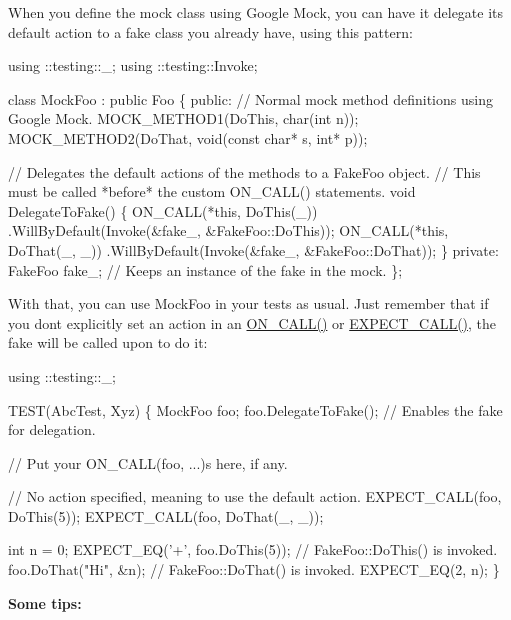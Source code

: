When you define the mock class using Google Mock, you can have it delegate its default action to a fake class you already have, using this pattern\+:


\begin{DoxyCode}
using ::testing::\_;
using ::testing::Invoke;

class MockFoo : public Foo \{
 public:
  // Normal mock method definitions using Google Mock.
  MOCK\_METHOD1(DoThis, char(int n));
  MOCK\_METHOD2(DoThat, void(const char* s, int* p));

  // Delegates the default actions of the methods to a FakeFoo object.
  // This must be called *before* the custom ON\_CALL() statements.
  void DelegateToFake() \{
    ON\_CALL(*this, DoThis(\_))
        .WillByDefault(Invoke(&fake\_, &FakeFoo::DoThis));
    ON\_CALL(*this, DoThat(\_, \_))
        .WillByDefault(Invoke(&fake\_, &FakeFoo::DoThat));
  \}
 private:
  FakeFoo fake\_;  // Keeps an instance of the fake in the mock.
\};
\end{DoxyCode}


With that, you can use {\ttfamily Mock\+Foo} in your tests as usual. Just remember that if you don\textquotesingle{}t explicitly set an action in an {\ttfamily \hyperlink{gmock-spec-builders_8h_a5b12ae6cf84f0a544ca811b380c37334}{O\+N\+\_\+\+C\+A\+L\+L()}} or {\ttfamily \hyperlink{gmock-spec-builders_8h_a535a6156de72c1a2e25a127e38ee5232}{E\+X\+P\+E\+C\+T\+\_\+\+C\+A\+L\+L()}}, the fake will be called upon to do it\+:


\begin{DoxyCode}
using ::testing::\_;

TEST(AbcTest, Xyz) \{
  MockFoo foo;
  foo.DelegateToFake(); // Enables the fake for delegation.

  // Put your ON\_CALL(foo, ...)s here, if any.

  // No action specified, meaning to use the default action.
  EXPECT\_CALL(foo, DoThis(5));
  EXPECT\_CALL(foo, DoThat(\_, \_));

  int n = 0;
  EXPECT\_EQ('+', foo.DoThis(5));  // FakeFoo::DoThis() is invoked.
  foo.DoThat("Hi", &n);           // FakeFoo::DoThat() is invoked.
  EXPECT\_EQ(2, n);
\}
\end{DoxyCode}


{\bfseries Some tips\+:}


